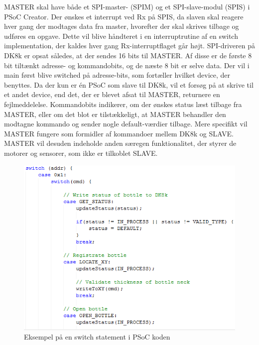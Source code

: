 MASTER skal have både et SPI-master- (SPIM) og et SPI-slave-modul (SPIS) i PSoC Creator. Der ønskes et interrupt ved Rx på SPIS, da slaven skal reagere
hver gang der modtages data fra master, hvorefter der skal skrives tilbage og udføres en opgave. Dette vil blive håndteret i en interruptrutine af en switch 
implementation, der kaldes hver gang Rx-interruptflaget går højt. SPI-driveren på DK8k er opsat således, at der sendes 16 bits til MASTER.
Af disse er de første 8 bit tiltænkt adresse- og kommandobits, og de næste 8 bit er selve data. Der vil i main først blive switched på adresse-bits,
som fortæller hvilket device, der benyttes. Da der kun er én PSoC som slave til DK8k, vil et forsøg på at skrive til et andet device, end det, der er blevet
afsat til MASTER, returnere en fejlmeddelelse. Kommandobits indikerer, om der ønskes status læst tilbage fra MASTER, eller om det blot er 
tilstækkeligt, at MASTER behandler den modtagne kommando og sender nogle default-værdier tilbage. Mere specifikt vil MASTER fungere som formidler af
kommandoer mellem DK8k og SLAVE. MASTER vil desuden indeholde anden særegen funktionalitet, der styrer de motorer og sensorer, som ikke er tilkoblet SLAVE.

\begin{figure}[H]
\includegraphics[scale=0.9]{Screenshots/PSOC_switch}
\caption{Eksempel på en switch statement i PSoC koden}
\end{figure}

